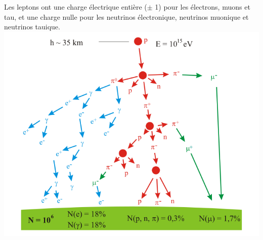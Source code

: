 Les leptons ont une charge électrique entière ($\pm$ 1) pour les électrons, muons et tau, et une charge nulle pour les neutrinos électronique, neutrinos muonique et neutrinos tauique.
\marginpar
{
\hspace*{-0.5cm}
\includegraphics[width=1.2\marginparwidth]{SM/shower.png}
    	\label{gerbe}
}
\marginpar
